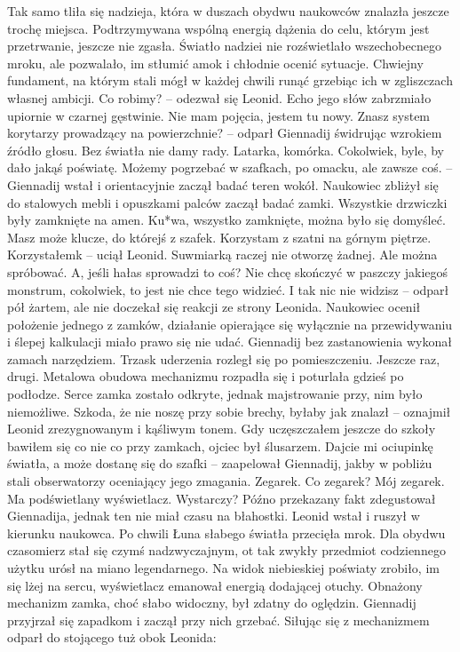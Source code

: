 \documentclass[../MAIN.tex]{subfiles}
\begin{document}
Tak samo tliła się nadzieja, która w duszach obydwu naukowców znalazła jeszcze trochę miejsca. Podtrzymywana wspólną energią dążenia do celu, którym jest przetrwanie, jeszcze nie zgasła. Światło nadziei nie rozświetlało wszechobecnego mroku, ale pozwalało, im stłumić amok i chłodnie ocenić sytuacje. Chwiejny fundament, na którym stali mógł w każdej chwili runąć grzebiąc ich w zgliszczach własnej ambicji. 
% 
\sx Co robimy? -- odezwał się Leonid. Echo jego słów zabrzmiało upiornie w czarnej gęstwinie. 
\xx Nie mam pojęcia, jestem tu nowy. Znasz system korytarzy prowadzący na powierzchnie? -- odparł Giennadij świdrując wzrokiem źródło głosu. 
\xx Bez światła nie damy rady. Latarka, komórka. Cokolwiek, byle, by dało jakąś poświatę. 
\xx Możemy pogrzebać w szafkach, po omacku, ale zawsze coś. -- Giennadij wstał i orientacyjnie zaczął badać teren wokół. 
\qd
Naukowiec zbliżył się do stalowych mebli i opuszkami palców zaczął badać zamki. Wszystkie drzwiczki były zamknięte na amen.
\sx Ku*wa, wszystko zamknięte, można było się domyśleć. Masz może klucze, do którejś z szafek. 
\xx Korzystam z szatni na górnym piętrze. Korzystałem\3k -- uciął Leonid. 
\xx Suwmiarką raczej nie otworzę żadnej. Ale można spróbować. 
\xx A, jeśli hałas sprowadzi to coś? Nie chcę skończyć w paszczy jakiegoś monstrum, cokolwiek, to jest nie chce tego widzieć. 
\xx I tak nic nie widzisz -- odparł pół żartem, ale nie doczekał się reakcji ze strony Leonida. 
\qd
Naukowiec ocenił położenie jednego z zamków, działanie opierające się wyłącznie na przewidywaniu i ślepej kalkulacji miało prawo się nie udać. Giennadij bez zastanowienia wykonał zamach narzędziem. Trzask uderzenia rozległ się po pomieszczeniu. Jeszcze raz, drugi. Metalowa obudowa mechanizmu rozpadła się i poturlała gdzieś po podłodze. Serce zamka zostało odkryte, jednak majstrowanie przy, nim było niemożliwe. 
\sx Szkoda, że nie noszę przy sobie brechy, byłaby jak znalazł -- oznajmił Leonid zrezygnowanym i kąśliwym tonem. 
\xx Gdy uczęszczałem jeszcze do szkoły bawiłem się co nie co przy zamkach, ojciec był ślusarzem. Dajcie mi ociupinkę światła, a może dostanę się do szafki -- zaapelował Giennadij, jakby w pobliżu stali obserwatorzy oceniający jego zmagania. 
\xx Zegarek. 
\xx Co zegarek? 
\xx Mój zegarek. Ma podświetlany wyświetlacz. Wystarczy? 
\qd
Późno przekazany fakt zdegustował Giennadija, jednak ten nie miał czasu na błahostki. Leonid wstał i ruszył w kierunku naukowca. Po chwili Łuna słabego światła przecięła mrok. Dla obydwu czasomierz stał się czymś nadzwyczajnym, ot tak zwykły przedmiot codziennego użytku urósł na miano legendarnego. Na widok niebieskiej poświaty zrobiło, im się lżej na sercu, wyświetlacz emanował energią dodającej otuchy. Obnażony mechanizm zamka, choć słabo widoczny, był zdatny do oględzin. Giennadij przyjrzał się zapadkom i zaczął przy nich grzebać. Siłując się z mechanizmem odparł do stojącego tuż obok Leonida: 
\end{document}
